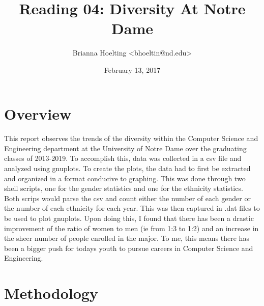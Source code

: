 \documentclass[letterpaper]{article}
\begin{document}

\title{Reading 04: Diversity At Notre Dame}
\date{February 13, 2017}                                                
\author{Brianna Hoelting {\textless}bhoeltin@nd.edu{\textgreater}}

\maketitle


\section{Overview}

\paragraph{}

This report observes the trends of the diversity within the Computer Science and Engineering department at the University of Notre Dame over the graduating classes of 2013-2019. To accomplish this, data was collected in a csv file and analyzed using gnuplots. To create the plots, the data had to first be extracted and organized in a format conducive to graphing. This was done through two shell scripts, one for the gender statistics and one for the ethnicity statistics. Both scrips would parse the csv and count either the number of each gender or the number of each ethnicity for each year. This was then captured in .dat files to be used to plot gnuplots. Upon doing this, I found that there has been a drastic improvement of the ratio of women to men (ie from 1:3 to 1:2) and an increase in the sheer number of people enrolled in the major. To me, this means there has been a bigger push for todays youth to pursue careers in Computer Science and Engineering.


\section{Methodology}

\paragraph{}
\end{document}
